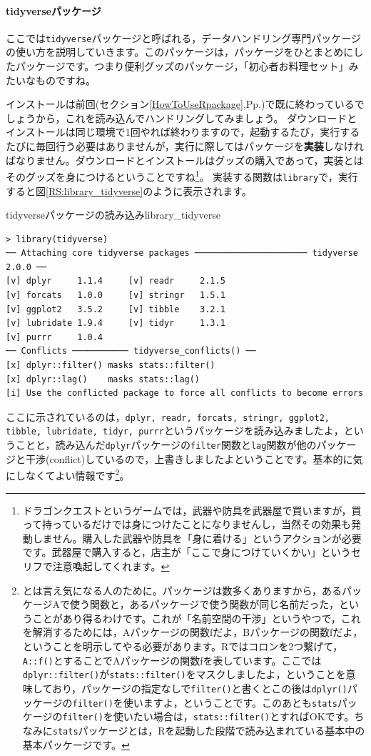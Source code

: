 \documentclass{ltjsbook}
\begin{document}
\paragraph{tidyverseパッケージ}
ここでは\verb|tidyverse|パッケージと呼ばれる，データハンドリング専門パッケージの使い方を説明していきます。このパッケージは，パッケージをひとまとめにしたパッケージです。つまり便利グッズのパッケージ，「初心者お料理セット」みたいなものですね。

インストールは前回(セクション\ref{HowToUseRpackage},Pp.\pageref{HowToUseRpackage})で既に終わっているでしょうから，これを読み込んでハンドリングしてみましょう。
ダウンロードとインストールは同じ環境で1回やれば終わりますので，起動するたび，実行するたびに毎回行う必要はありませんが，実行に際してはパッケージを\textbf{実装}しなければなりません。ダウンロードとインストールはグッズの購入であって，実装とはそのグッズを身につけるということですね\footnote{ドラゴンクエストというゲームでは，武器や防具を武器屋で買いますが，買って持っているだけでは身につけたことになりませんし，当然その効果も発動しません。購入した武器や防具を「身に着ける」というアクションが必要です。武器屋で購入すると，店主が「ここで身につけていくかい」というセリフで注意喚起してくれます。}。
実装する関数は\verb|library|で，実行すると図\ref{RS:library_tidyverse}のように表示されます。

\begin{Rscreen}{tidyverseパッケージの読み込み}{library_tidyverse}
	\begin{verbatim}
> library(tidyverse)
── Attaching core tidyverse packages ────────────────────── tidyverse 2.0.0 ──
[v] dplyr     1.1.4     [v] readr     2.1.5
[v] forcats   1.0.0     [v] stringr   1.5.1
[v] ggplot2   3.5.2     [v] tibble    3.2.1
[v] lubridate 1.9.4     [v] tidyr     1.3.1
[v] purrr     1.0.4     
── Conflicts ─────────── tidyverse_conflicts() ──
[x] dplyr::filter() masks stats::filter()
[x] dplyr::lag()    masks stats::lag()
[i] Use the conflicted package to force all conflicts to become errors
\end{verbatim}
\end{Rscreen}
ここに示されているのは，\verb|dplyr, readr, forcats, stringr, ggplot2, tibble, lubridate, tidyr, purrr|というパッケージを読み込みましたよ，ということと，読み込んだ\verb|dplyr|パッケージの\verb|filter|関数と\verb|lag|関数が他のパッケージと干渉(conflict)しているので，上書きしましたよということです。基本的に気にしなくてよい情報です\footnote{とは言え気になる人のために。パッケージは数多くありますから，あるパッケージAで使う関数と，あるパッケージで使う関数が同じ名前だった，ということがあり得るわけです。これが「名前空間の干渉」というやつで，これを解消するためには，Aパッケージの関数fだよ，Bパッケージの関数fだよ，ということを明示してやる必要があります。Rではコロンを2つ繋げて，\verb|A::f()|とすることでAパッケージの関数fを表しています。ここでは\verb|dplyr::filter()|が\verb|stats::filter()|をマスクしましたよ，ということを意味しており，パッケージの指定なしで\verb|filter()|と書くとこの後は\verb|dplyr()|パッケージの\verb|filter()|を使いますよ，ということです。このあとも\verb|stats|パッケージの\verb|filter()|を使いたい場合は，\verb|stats::filter()|とすればOKです。ちなみに\verb|stats|パッケージとは，Rを起動した段階で読み込まれている基本中の基本パッケージです。}。
\end{document}
